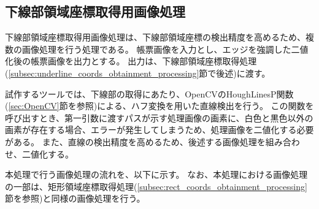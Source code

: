 \subsection{下線部領域座標取得用画像処理}\label{subsec:image_processing_for_underline_coords_obtainment}
下線部領域座標取得用画像処理は、下線部領域座標の検出精度を高めるため、複数の画像処理を行う処理である。
帳票画像を入力とし、エッジを強調した二値化後の帳票画像を出力とする。
出力は、下線部領域座標取得処理(\ref{subsec:underline_coords_obtainment_processing}節で後述)に渡す。

試作するツールでは、下線部の取得にあたり、OpenCVのHoughLinesP関数(\ref{sec:OpenCV}節を参照)による、ハフ変換を用いた直線検出を行う。
この関数を呼び出すとき、第一引数に渡すパスが示す処理画像の画素に、白色と黒色以外の画素が存在する場合、エラーが発生してしまうため、処理画像を二値化する必要がある。
また、直線の検出精度を高めるため、後述する画像処理を組み合わせ、二値化する。

本処理で行う画像処理の流れを、以下に示す。
なお、本処理における画像処理の一部は、矩形領域座標取得処理(\ref{subsec:rect_coords_obtainment_processing}節を参照)と同様の画像処理を行う。

